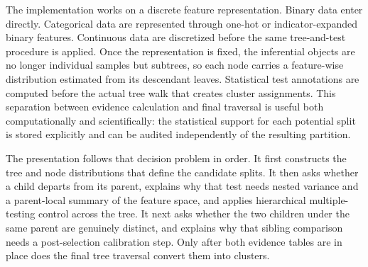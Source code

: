The implementation works on a discrete feature representation. Binary data
enter directly. Categorical data are represented through one-hot or indicator-expanded
binary features. Continuous data are discretized before the same tree-and-test
procedure is applied. Once the representation is fixed, the inferential objects
are no longer individual samples but subtrees, so each node carries a
feature-wise distribution estimated from its descendant leaves. Statistical
test annotations are computed before the actual tree walk that creates cluster
assignments. This separation between evidence calculation and final traversal
is useful both computationally and scientifically: the statistical support for
each potential split is stored explicitly and can be audited independently of
the resulting partition.

The presentation follows that decision problem in order. It first constructs the
tree and node distributions that define the candidate splits. It then asks
whether a child departs from its parent, explains why that test needs nested
variance and a parent-local summary of the feature space, and applies hierarchical multiple-testing
control across the tree. It next asks whether the two children under the same
parent are genuinely distinct, and explains why that sibling comparison needs a
post-selection calibration step. Only after both evidence tables are in place
does the final tree traversal convert them into clusters.

